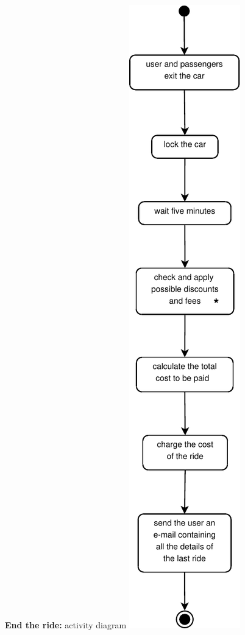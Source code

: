 \documentclass{beamer}
\begin{document}
	\begin{frame}{\textbf{End the ride:} activity diagram}
		\includegraphics[height = 0.9\textheight]{figures/adENDofRIDE.pdf}
	\end{frame}
\end{document}
